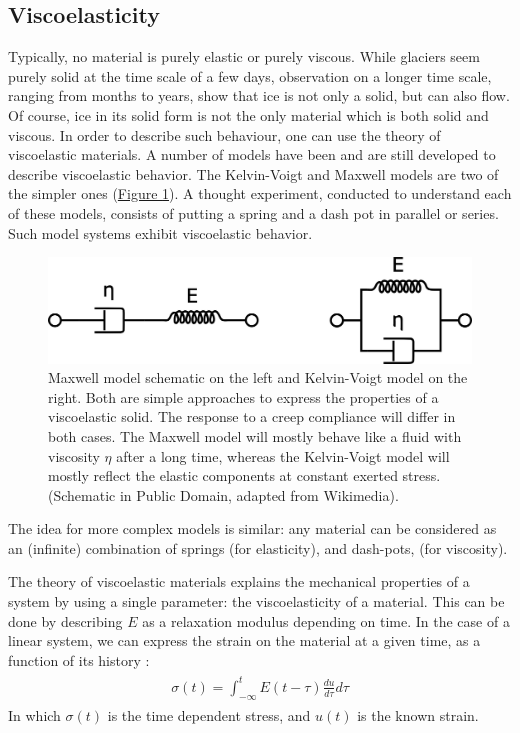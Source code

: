 \documentclass[A4paperpaper,11pt,english]{sphinxmanual}
\begin{document}
\subsection{Viscoelasticity}
\label{parts/part1:viscoelasticity}
Typically, no material is purely elastic or purely viscous. While glaciers
seem purely solid at the time scale of a few days, observation on a longer time
scale, ranging from months to years, show that ice is not only a
solid, but can also flow. Of course, ice in its solid form is not the only
material which is both solid and viscous. In order to describe such
behaviour, one can use the theory of viscoelastic materials.  A number of models have
been and are still developed to describe viscoelastic behavior. The
Kelvin-Voigt and Maxwell models are two of the simpler ones (\hyperref[parts/part1:fig-mkv]{Figure  \ref*{parts/part1:fig-mkv}}). A thought
experiment, conducted to understand each of these models, consists of putting a spring and a dash pot
in parallel or series. Such model systems exhibit viscoelastic behavior.
\begin{figure}[htbp]
\centering
\capstart

\includegraphics[width=0.700\linewidth]{MKV.png}
\caption{Maxwell model schematic on the left and Kelvin-Voigt model on the right.
Both are simple approaches to express the properties of a viscoelastic
solid. The response to a creep compliance will differ in both cases. The Maxwell
model will mostly behave like a fluid with viscosity \(\eta\) after a
long time, whereas the Kelvin-Voigt model will mostly reflect the elastic
components at constant exerted stress. (Schematic in Public Domain, adapted
from Wikimedia).}\label{parts/part1:fig-mkv}\end{figure}

The idea for more complex models is similar: any material can be considered as an
(infinite) combination of springs (for elasticity), and dash-pots, (for viscosity).

The theory of viscoelastic materials explains the mechanical properties of a system by
using a single parameter: the viscoelasticity of a material. This can
be done by describing \(E\) as a relaxation modulus depending on time.  In
the case of a linear system, we can express the strain on the material at a given
time, as a function of its history :
\label{parts/part1:equation-strain}\begin{gather}
\begin{split}\sigma (t)  = \int_{-\infty}^t E(t-\tau) \frac{du}{d\tau} d\tau\end{split}\label{parts/part1-strain}
\end{gather}
In which \(\sigma(t)\) is the time dependent stress, and \(u(t)\) is
the known strain.
\end{document}
